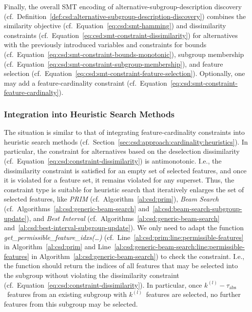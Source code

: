 \documentclass{article}
\theoremstyle{definition}
\begin{document}
Finally, the overall SMT encoding of alternative-subgroup-description discovery (cf.~Definition~\ref{def:csd:alternative-subgroup-description-discovery}) combines the similarity objective (cf.~Equation~\ref{eq:csd:smt-hamming}) and dissimilarity constraints (cf.~Equation~\ref{eq:csd:smt-constraint-dissimilarity}) for alternatives with the previously introduced variables and constraints for bounds (cf.~Equation~\ref{eq:csd:smt-constraint-bounds-monotonic}), subgroup membership (cf.~Equation~\ref{eq:csd:smt-constraint-subgroup-membership}), and feature selection (cf.~Equation~\ref{eq:csd:smt-constraint-feature-selection}).
Optionally, one may add a feature-cardinality constraint (cf.~Equation~\ref{eq:csd:smt-constraint-feature-cardinalty}).

\subsubsection{Integration into Heuristic Search Methods}
\label{sec:csd:approach:alternatives:heuristics}

The situation is similar to that of integrating feature-cardinality constraints into heuristic search methods (cf.~Section~\ref{sec:csd:approach:cardinality:heuristics}).
In particular, the constraint for alternatives based on the deselection dissimilarity (cf.~Equation~\ref{eq:csd:constraint-dissimilarity}) is antimonotonic.
I.e., the dissimilarity constraint is satisfied for an empty set of selected features, and once it is violated for a feature set, it remains violated for any superset.
Thus, the constraint type is suitable for heuristic search that iteratively enlarges the set of selected features, like \emph{PRIM} (cf.~Algorithm~\ref{al:csd:prim}), \emph{Beam Search} (cf.~Algorithms~\ref{al:csd:generic-beam-search} and~\ref{al:csd:beam-search-subgroup-update}), and \emph{Best Interval} (cf.~Algorithms~\ref{al:csd:generic-beam-search} and~\ref{al:csd:best-interval-subgroup-update}).
We only need to adapt the function \emph{get\_permissible\_feature\_idxs(\dots)} (cf.~Line~\ref{al:csd:prim:line:permissible-features} in Algorithm~\ref{al:csd:prim} and Line~\ref{al:csd:generic-beam-search:line:permissible-features} in Algorithm~\ref{al:csd:generic-beam-search}) to check the constraint.
I.e., the function should return the indices of all features that may be selected into the subgroup without violating the dissimilarity constraint (cf.~Equation~\ref{eq:csd:constraint-dissimilarity}).
In particular, once $k^{(l)} - \tau_{\text{abs}}$~features from an existing subgroup with $k^{(l)}$~features are selected, no further features from this subgroup may be selected.
\end{document}
